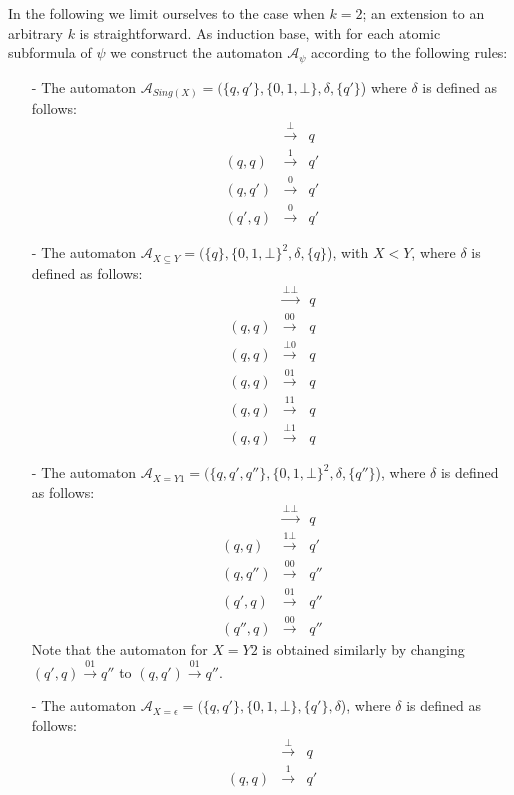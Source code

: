 In the following we limit ourselves to the case when $k = 2$; an extension to an
arbitrary $k$ is straightforward. As induction base, with for each atomic
subformula of $\psi$ we construct the automaton $\mathcal{A}_{\psi}$ according
to the following rules:
\begin{itemize}
 \item[-] The automaton $\mathcal{A}_{Sing(X)} = (\{q, q'\}, \{0, 1, \bot\},
 \delta, \{q'\}$) where $\delta$ is defined as follows:
\begin{eqnarray*}
  & \overset{\bot}{\longrightarrow} & q\\
 (q, q) & \overset{1}{\longrightarrow} & q'\\
 (q, q') & \overset{0}{\longrightarrow} & q'\\
 (q', q) & \overset{0}{\longrightarrow} & q'
\end{eqnarray*}
 \item[-] The automaton $\mathcal{A}_{X \subseteq Y} = (\{q\}, \{0, 1, \bot\}^2,
 \delta, \{q\}$), with $X < Y$, where $\delta$ is defined as follows:
\begin{eqnarray*}
  & \overset{\bot\bot}{\longrightarrow} & q\\
  (q, q) & \overset{00}{\longrightarrow} & q\\
  (q, q) & \overset{\bot 0}{\longrightarrow} & q\\
  (q, q) & \overset{01}{\longrightarrow} & q\\
  (q, q) & \overset{11}{\longrightarrow} & q\\
  (q, q) & \overset{\bot 1}{\longrightarrow} & q
\end{eqnarray*}
 \item[-] The automaton $\mathcal{A}_{X = Y1} = (\{q, q', q''\}, \{0, 1,
 \bot\}^2, \delta, \{q''\}$), where $\delta$ is defined as follows:
\begin{eqnarray*}
  & \overset{\bot\bot}{\longrightarrow} & q\\
  (q, q) & \overset{1\bot}{\longrightarrow} & q'\\
  (q, q'') & \overset{00}{\longrightarrow} & q''\\
  (q', q) & \overset{01}{\longrightarrow} & q''\\
  (q'', q) & \overset{00}{\longrightarrow} & q''
\end{eqnarray*}
Note that the automaton for $X = Y2$ is obtained similarly by changing $(q', q)
\overset{01}{\longrightarrow} q''$ to $(q, q') \overset{01}{\longrightarrow}
 q''$.
 \item[-] The automaton $\mathcal{A}_{X = \epsilon} = (\{q, q'\}, \{0, 1,
 \bot\}, \{q'\}, \delta$), where $\delta$ is defined as follows:
\begin{eqnarray*}
  & \overset{\bot}{\longrightarrow} & q\\
 (q, q) & \overset{1}{\longrightarrow}& q'
\end{eqnarray*}
\end{itemize}


